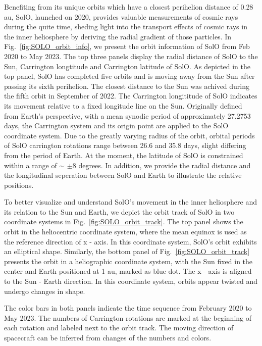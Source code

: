 Benefiting from its unique orbits which have a closest perihelion distance of 0.28 au, \ac{SolO}, launched on 2020, provides valuable measurements of cosmic rays during the quite time, sheding light into the transport effects of cosmic rays in the inner heliosphere by deriving the radial gradient of those particles.
In Fig.~\ref{fig:SOLO_orbit_info}, we present the orbit information of \ac{SolO} from Feb 2020 to May 2023. The top three panels display the radial distance of \ac{SolO} to the Sun, Carrington longtitude and Carrington latitude of \ac{SolO}. As depicted in the top panel, \ac{SolO} has completed five orbits and is moving away from the Sun after passing its sixth perihelion. The closest distance to the Sun was achived during the fifth orbit in September of 2022. 
The Carrington longititude of \ac{SolO} indicates its movement relative to a fixed longitude line on the Sun. Originally defined from Earth's perspective, with a mean synodic period of approximately 27.2753 days, the Carrington system and its origin point are applied to the \ac{SolO} coordinate system. 
Due to the greatly varying radius of the orbit, orbital periods of \ac{SolO} carrington rotations range between 26.6 and 35.8 days, slight differing from the period of Earth. At the moment, the latitude of \ac{SolO} is constrained within a range of $\sim$ $\pm$8 degrees.
In addition, we provide the radial distance and the longitudinal seperation between \ac{SolO} and Earth to illustrate the relative positions.

To better visualize and understand \ac{SolO}'s movement in the inner heliosphere and its relation to the Sun and Earth, we depict the orbit track of \ac{SolO} in two coordinate systems in Fig.~\ref{fig:SOLO_orbit_track}. The top panel shows the orbit in the  heliocentric coordinate system, where the mean equinox is used as the reference direction of x - axis. In this coordinate system, \ac{SolO}'s orbit exhibits an elliptical shape. Similarly, the bottom panel of Fig.~\ref{fig:SOLO_orbit_track} presents the orbit in a heliographic coordinate system, with the Sun fixed in the center and Earth positioned at 1 au, marked as blue dot. The x - axis is aligned to the Sun - Earth direction. In this coordinate system, orbits appear twisted and undergo changes in shape.

The color bars in both panels indicate the time sequence from February 2020 to May 2023. The numbers of Carrington rotations are marked at the beginning of each rotation and labeled next to the orbit track. The moving direction of spacecraft can be inferred from changes of the numbers and colors.


